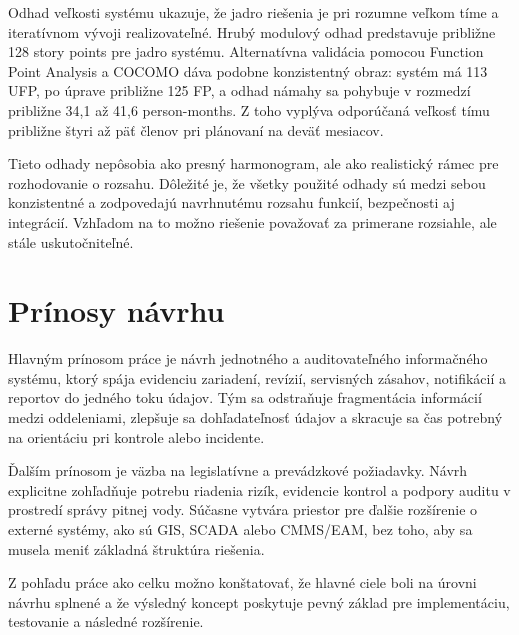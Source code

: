 Odhad veľkosti systému ukazuje, že jadro riešenia je pri rozumne veľkom tíme a iteratívnom vývoji realizovateľné. Hrubý modulový odhad predstavuje približne 128 story points pre jadro systému. Alternatívna validácia pomocou Function Point Analysis a COCOMO dáva podobne konzistentný obraz: systém má 113 UFP, po úprave približne 125 FP, a odhad námahy sa pohybuje v rozmedzí približne 34,1 až 41,6 person-months. Z toho vyplýva odporúčaná veľkosť tímu približne štyri až päť členov pri plánovaní na deväť mesiacov.

Tieto odhady nepôsobia ako presný harmonogram, ale ako realistický rámec pre rozhodovanie o rozsahu. Dôležité je, že všetky použité odhady sú medzi sebou konzistentné a zodpovedajú navrhnutému rozsahu funkcií, bezpečnosti aj integrácií. Vzhľadom na to možno riešenie považovať za primerane rozsiahle, ale stále uskutočniteľné.

\section{Prínosy návrhu}

Hlavným prínosom práce je návrh jednotného a auditovateľného informačného systému, ktorý spája evidenciu zariadení, revízií, servisných zásahov, notifikácií a reportov do jedného toku údajov. Tým sa odstraňuje fragmentácia informácií medzi oddeleniami, zlepšuje sa dohľadateľnosť údajov a skracuje sa čas potrebný na orientáciu pri kontrole alebo incidente.

Ďalším prínosom je väzba na legislatívne a prevádzkové požiadavky. Návrh explicitne zohľadňuje potrebu riadenia rizík, evidencie kontrol a podpory auditu v prostredí správy pitnej vody. Súčasne vytvára priestor pre ďalšie rozšírenie o externé systémy, ako sú GIS, SCADA alebo CMMS/EAM, bez toho, aby sa musela meniť základná štruktúra riešenia.

Z pohľadu práce ako celku možno konštatovať, že hlavné ciele boli na úrovni návrhu splnené a že výsledný koncept poskytuje pevný základ pre implementáciu, testovanie a následné rozšírenie.
